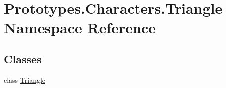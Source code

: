 \hypertarget{namespace_prototypes_1_1_characters_1_1_triangle}{}\section{Prototypes.\+Characters.\+Triangle Namespace Reference}
\label{namespace_prototypes_1_1_characters_1_1_triangle}
\subsection*{Classes}
\begin{DoxyCompactItemize}
\item 
class \mbox{\hyperlink{class_prototypes_1_1_characters_1_1_triangle_1_1_triangle}{Triangle}}
\end{DoxyCompactItemize}

